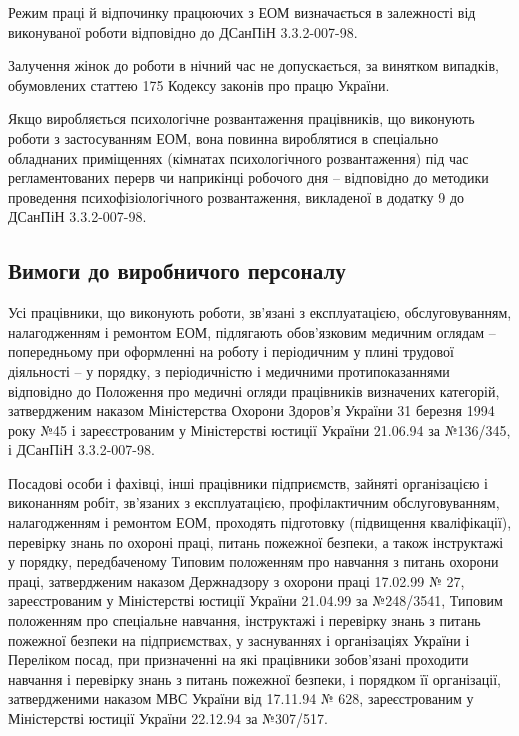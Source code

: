 \documentclass[simple,a4paper,14pt,ukrainian,utf8]{eskdtext}
\begin{document}
\begin{appendices}
                Режим праці й відпочинку працюючих з ЕОМ визначається в залежності від виконуваної роботи відповідно до ДСанПіН 3.3.2-007-98.

                Залучення жінок до роботи в нічний час не допускається, за винятком випадків, обумовлених статтею 175 Кодексу законів про працю України.

                Якщо виробляється психологічне розвантаження працівників, що виконують роботи з застосуванням ЕОМ, вона повинна вироблятися в спеціально обладнаних приміщеннях (кімнатах психологічного розвантаження) під час регламентованих перерв чи наприкінці робочого дня -- відповідно до методики проведення психофізіологічного розвантаження, викладеної в додатку 9  до ДСанПіН 3.3.2-007-98.

            \subsection{Вимоги до виробничого персоналу}

                Усі працівники, що виконують роботи, зв'язані з експлуатацією, обслуговуванням, налагодженням і ремонтом ЕОМ, підлягають обов'язковим медичним оглядам -- попередньому при оформленні на роботу і періодичним у плині трудової діяльності -- у порядку, з періодичністю і медичними протипоказаннями відповідно до Положення про медичні огляди працівників визначених категорій, затвердженим наказом Міністерства Охорони Здоров'я України 31 березня 1994 року №45 і зареєстрованим у Міністерстві юстиції України 21.06.94 за №136/345, і ДСанПіН 3.3.2-007-98.

                Посадові особи і фахівці, інші працівники підприємств, зайняті організацією і виконанням робіт, зв'язаних з експлуатацією, профілактичним обслуговуванням, налагодженням і ремонтом ЕОМ, проходять підготовку (підвищення кваліфікації), перевірку знань по охороні праці, питань пожежної безпеки, а також інструктажі у порядку, передбаченому Типовим положенням про навчання з питань охорони праці, затвердженим наказом Держнадзору з охорони праці 17.02.99 № 27, зареєстрованим у Міністерстві юстиції України 21.04.99 за №248/3541, Типовим положенням про спеціальне навчання, інструктажі і перевірку знань з питань пожежної безпеки на підприємствах, у заснуваннях і організаціях України і Переліком посад, при призначенні на які працівники зобов'язані проходити навчання і перевірку знань з питань пожежної безпеки, і порядком її організації, затвердженими наказом МВС України від 17.11.94 № 628, зареєстрованим у Міністерстві юстиції України 22.12.94 за №307/517.


\end{appendices}
\end{document}
